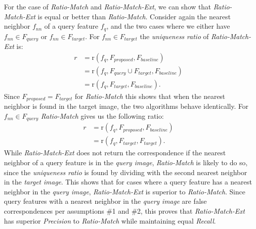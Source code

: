 \documentclass[10pt,journal,cspaper,compsoc]{IEEEtran}
\begin{document}
For the case of \emph{Ratio-Match} and \emph{Ratio-Match-Ext}, we 
can show that \emph{Ratio-Match-Ext} is equal or better than 
\emph{Ratio-Match}.  Consider again the nearest neighbor $f_{nn}$ of a 
query feature $f_{q}$, and the two cases where we either have $f_{nn} 
\in F_{query}$ or $f_{nn} \in F_{target}$. For $f_{nn} \in F_{target}$ 
the \emph{uniqueness ratio} of \emph{Ratio-Match-Ext} is:
\begin{align*}
    r &= \text{r}(f_{q}, F_{proposed}, F_{baseline}) \\
        &= \text{r}(f_{q}, F_{query} \cup F_{target}, F_{baseline})\\
        &= \text{r}(f_{q}, F_{target}, F_{baseline}).
\end{align*}
Since $F_{proposed} = F_{target}$ for \emph{Ratio-Match} this shows that
when the nearest neighbor is found in the target image, the two 
algorithms behave identically. For $f_{nn} \in F_{query}$ 
\emph{Ratio-Match} gives us the following ratio:
\begin{align*}
    r &= \text{r}(f_{q}, F_{proposed}, F_{baseline}) \\
        &= \text{r}(f_{q}, F_{target}, F_{target}).
\end{align*}
While \emph{Ratio-Match-Ext} does not return the correspondence if 
the nearest neighbor of a query feature is in the \emph{query image}, 
\emph{Ratio-Match} is likely to do so, since the \emph{uniqueness ratio} is 
found by dividing with the second nearest neighbor in the \emph{target 
image}. This shows that for cases where a query feature has a nearest 
neighbor in the \emph{query image}, \emph{Ratio-Match-Ext} is superior 
to \emph{Ratio-Match}. Since query features with a nearest neighbor in 
the \emph{query image} are false correspondences per assumptions \#1 and 
\#2, this proves that \emph{Ratio-Match-Ext} has superior 
\emph{Precision} to \emph{Ratio-Match} while maintaining equal 
\emph{Recall}.
\end{document}
